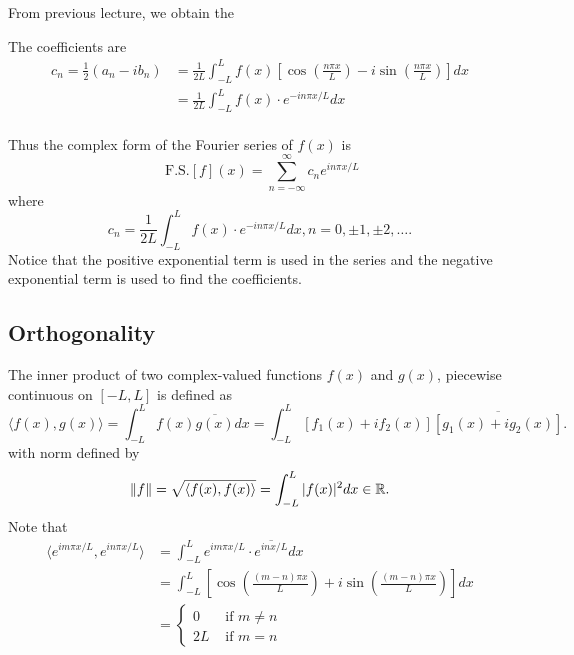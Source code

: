 \documentclass[class=article,crop=false]{standalone}
\begin{document}
From previous lecture, we obtain the 

The coefficients are
\begin{align*}
	c_n = \frac{1}{2}(a_n - ib_n) &= \frac{1}{2L} \int_{-L}^{L} f(x) \left[ \cos \left( \frac{ n\pi x}{ L} \right) -i\sin \left( \frac{ n\pi x}{ L} \right)  \right] dx  \\
				      &= \frac{1}{2L} \int_{-L}^{L} f(x) \cdot e^{-i n \pi x / L} dx \\
\end{align*}

Thus the complex form of the Fourier series of $ f(x)$ is
 \[
\text{ F.S.} [ f]( x) = \sum_{ n=-\infty}^{\infty} c_n e^{in\pi x /L}
\]
where
\[
c_n =  \frac{1}{2L} \int_{-L}^{L} f(x) \cdot e^{-i n \pi x / L} dx, n=0, \pm 1, \pm 2, \ldots 
.\]
Notice that the positive exponential term is used in the series and the negative exponential term is used to find the coefficients.

\subsection{Orthogonality}
The inner product of two complex-valued functions $ f(x) $ and  $ g(x)$, piecewise continuous on  $ [-L,L]$ is defined as
 \[
	 \langle f(x),g(x) \rangle = \int_{-L}^{L} f(x) \overline{g(x)} dx = \int_{-L}^{L} [f_1(x)+ if_2(x)]\overline{[g_1(x)+ig_2(x)]}  
.\] 
with norm defined by
 \[
	 {\left\lVert{f}\right\rVert} = \sqrt{\langle f(x),f(x) \rangle}  = \int_{-L}^{L} |f(x)|^2 dx \in \mathbb{R} 
.\] 
Note that 
\begin{align*}
	\langle e^{i m \pi x / L} , e^{i n \pi x /L}\rangle &= \int_{-L}^{L} e^{i m \pi x /L} \cdot \overline{e^{i n x /L}}dx  \\
							    &= \int_{-L}^{L} \left[ \cos \left( \frac{ (m-n) \pi x}{ L} \right) + i \sin \left( \frac{ (m-n)\pi x}{ L} \right)  \right]  dx \\
							    &= \begin{cases}
								    0& \text{ if } m\neq n\\
								    2L & \text{ if } m=n \
							    \end{cases} \\
\end{align*}
\end{document}

